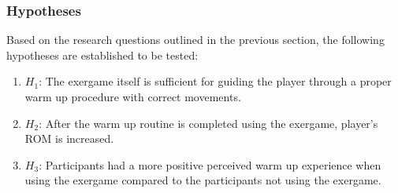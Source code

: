 \subsubsection{Hypotheses}
Based on the research questions outlined in the previous section, the following hypotheses are established to be tested: 
\begin{enumerate}
\item \begin{math}H_{1}\end{math}: The exergame itself is sufficient for guiding the player through a proper warm up procedure with correct movements. 
\item \begin{math}H_{2}\end{math}: After the warm up routine is completed using the exergame, player's ROM is increased.
\item \begin{math}H_{3}\end{math}: Participants had a more positive perceived warm up experience when using the exergame compared to the participants not using the exergame.  
\end{enumerate}
\pagebreak

